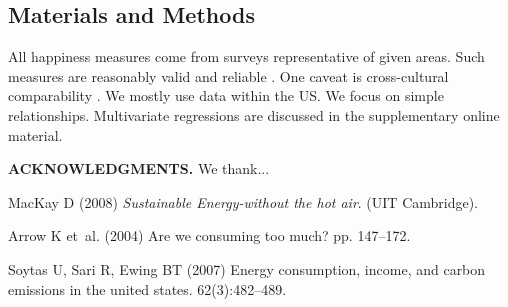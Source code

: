 \documentclass[10pt, letterpaper]{article}
\begin{document}
\begin{spacing}{1.4}



\section*{\large \bf Materials and Methods}
All happiness measures come from surveys representative of given areas. Such measures are reasonably valid and
reliable \cite{diener13b}. %
One caveat is cross-cultural comparability \cite{diener03b}. %
 We mostly use data within the US. %
We focus on simple relationships. Multivariate regressions are
discussed in the supplementary online material. 


\noindent\textbf{ACKNOWLEDGMENTS.} We thank... 


\newpage
%
\begin{thebibliography}{10}

MacKay D (2008) {\em Sustainable Energy-without the hot air}.
\newblock (UIT Cambridge).

Arrow K et~al. (2004) Are we consuming too much?
 pp. 147--172.

Soytas U, Sari R, Ewing BT (2007) Energy consumption, income, and carbon
  emissions in the united states.
 62(3):482--489.


\end{thebibliography}
\end{spacing}
\end{document}

